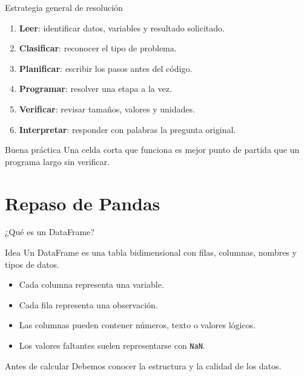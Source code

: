 \documentclass[10pt]{beamer}
\begin{document}
\begin{frame}{Estrategia general de resolución}
  \begin{enumerate}
    \item \textbf{Leer}: identificar datos, variables y resultado solicitado.
    \item \textbf{Clasificar}: reconocer el tipo de problema.
    \item \textbf{Planificar}: escribir los pasos antes del código.
    \item \textbf{Programar}: resolver una etapa a la vez.
    \item \textbf{Verificar}: revisar tamaños, valores y unidades.
    \item \textbf{Interpretar}: responder con palabras la pregunta original.
  \end{enumerate}

  \begin{alertblock}{Buena práctica}
    Una celda corta que funciona es mejor punto de partida que un programa largo sin verificar.
  \end{alertblock}
\end{frame}

\section{Repaso de Pandas}

\begin{frame}{¿Qué es un DataFrame?}
  \begin{block}{Idea}
    Un DataFrame es una tabla bidimensional con filas, columnas, nombres y tipos de datos.
  \end{block}

  \begin{itemize}
    \item Cada columna representa una variable.
    \item Cada fila representa una observación.
    \item Las columnas pueden contener números, texto o valores lógicos.
    \item Los valores faltantes suelen representarse con \texttt{NaN}.
  \end{itemize}

  \begin{alertblock}{Antes de calcular}
    Debemos conocer la estructura y la calidad de los datos.
  \end{alertblock}
\end{frame}
\end{document}
